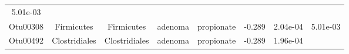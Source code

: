\documentclass[11pt,]{article}
\begin{document}
\begin{longtable}[]{@{}cccccccc@{}}
\begin{minipage}[t]{0.08\columnwidth}
5.01e-03\strut
\end{minipage}\tabularnewline
\begin{minipage}[t]{0.08\columnwidth}\centering\strut
Otu00308\strut
\end{minipage} & \begin{minipage}[t]{0.15\columnwidth}\centering\strut
Firmicutes\strut
\end{minipage} & \begin{minipage}[t]{0.15\columnwidth}\centering\strut
Firmicutes\strut
\end{minipage} & \begin{minipage}[t]{0.08\columnwidth}\centering\strut
adenoma\strut
\end{minipage} & \begin{minipage}[t]{0.09\columnwidth}\centering\strut
propionate\strut
\end{minipage} & \begin{minipage}[t]{0.07\columnwidth}\centering\strut
-0.289\strut
\end{minipage} & \begin{minipage}[t]{0.08\columnwidth}\centering\strut
2.04e-04\strut
\end{minipage} & \begin{minipage}[t]{0.08\columnwidth}\centering\strut
5.01e-03\strut
\end{minipage}\tabularnewline
\begin{minipage}[t]{0.08\columnwidth}\centering\strut
Otu00492\strut
\end{minipage} & \begin{minipage}[t]{0.15\columnwidth}\centering\strut
Clostridiales\strut
\end{minipage} & \begin{minipage}[t]{0.15\columnwidth}\centering\strut
Clostridiales\strut
\end{minipage} & \begin{minipage}[t]{0.08\columnwidth}\centering\strut
adenoma\strut
\end{minipage} & \begin{minipage}[t]{0.09\columnwidth}\centering\strut
propionate\strut
\end{minipage} & \begin{minipage}[t]{0.07\columnwidth}\centering\strut
-0.289\strut
\end{minipage} & \begin{minipage}[t]{0.08\columnwidth}\centering\strut
1.96e-04\strut
\end{minipage} & \begin{minipage}[t]{0.08\columnwidth}\centering\strut

\end{minipage}
\end{longtable}
\end{document}
